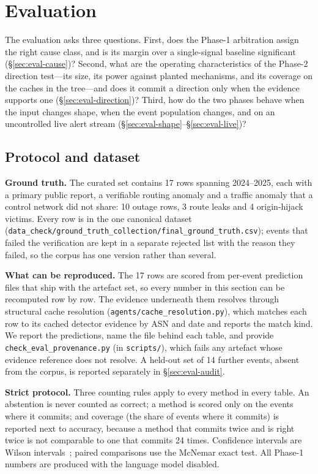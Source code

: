 \section{Evaluation}
\label{sec:eval}

The evaluation asks three questions. First, does the Phase-1 arbitration
assign the right cause class, and is its margin over a single-signal
baseline significant (\S\ref{sec:eval-cause})? Second, what are the
operating characteristics of the Phase-2 direction test---its size, its
power against planted mechanisms, and its coverage on the caches in the
tree---and does it commit a direction only when the evidence supports one
(\S\ref{sec:eval-direction})? Third, how do the two phases behave when the
input changes shape, when the event population changes, and on an
uncontrolled live alert stream (\S\ref{sec:eval-shape}--\S\ref{sec:eval-live})?

\subsection{Protocol and dataset}
\label{sec:eval-protocol}

\textbf{Ground truth.} The curated set contains 17 rows spanning
2024--2025, each with a primary public report, a verifiable routing
anomaly and a traffic anomaly that a control network did not share:
10 outage rows, 3 route leaks and 4 origin-hijack victims. Every row is
in the one canonical dataset
(\texttt{data\_check/ground\_truth\_collection/final\_ground\_truth.csv});
events that failed the verification are kept in a separate rejected list
with the reason they failed, so the corpus has one version rather than
several.

\textbf{What can be reproduced.} The 17 rows are scored from per-event
prediction files that ship with the artefact set, so every number in this
section can be recomputed row by row. The evidence underneath them
resolves through structural cache resolution
(\texttt{agents/cache\_resolution.py}), which matches each row to its
cached detector evidence by ASN and date and reports the match kind.
We report the predictions, name the file behind each table, and provide
\texttt{check\_eval\_provenance.py} (in \texttt{scripts/}), which fails
any artefact whose evidence reference does not resolve. A held-out set of
14 further events, absent from the corpus, is reported separately in
\S\ref{sec:eval-audit}.

\textbf{Strict protocol.} Three counting rules apply to every method in
every table. An abstention is never counted as correct; a method is scored
only on the events where it commits; and coverage (the share of events
where it commits) is reported next to accuracy, because a method that
commits twice and is right twice is not comparable to one that commits 24
times. Confidence intervals are Wilson intervals~\cite{wilson-1927}; paired
comparisons use the McNemar exact test. All Phase-1 numbers are produced
with the language model disabled.

